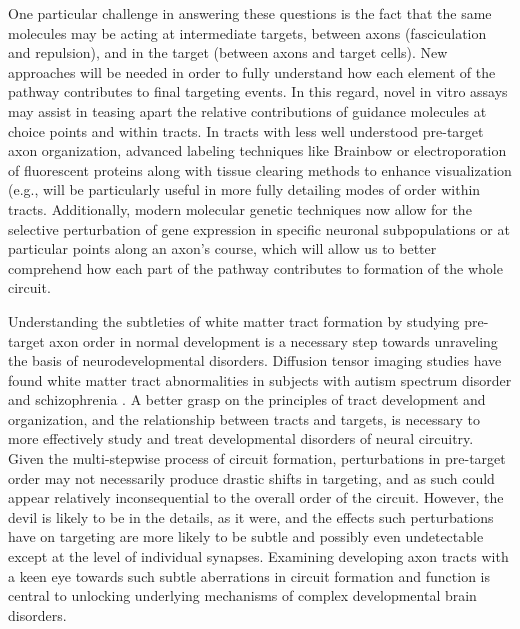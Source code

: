 One particular challenge in answering these questions is the fact that the same molecules may be acting at intermediate targets, between axons (fasciculation and repulsion), and in the target (between axons and target cells). 
New approaches will be needed in order to fully understand how each element of the pathway contributes to final targeting events. 
In this regard, novel in vitro assays may assist in teasing apart the relative contributions of guidance molecules at choice points and within tracts. 
In tracts with less well understood pre-target axon organization, advanced labeling techniques like Brainbow \cite{lu2009interscutularis} or electroporation of fluorescent proteins \cite{saito2001efficient} along with tissue clearing methods to enhance visualization (e.g., \cite{erturk2012three,kuwajima2013cleart,tomer2014advanced} will be particularly useful in more fully detailing modes of order within tracts. %
Additionally, modern molecular genetic techniques now allow for the selective perturbation of gene expression in specific neuronal subpopulations or at particular points along an axon’s course, which will allow us to better comprehend how each part of the pathway contributes to formation of the whole circuit. 

Understanding the subtleties of white matter tract formation by studying pre-target axon order in normal development is a necessary step towards unraveling the basis of neurodevelopmental disorders. 
Diffusion tensor imaging studies have found white matter tract abnormalities in subjects with autism spectrum disorder \cite{wolff2012differences} and schizophrenia \cite{kubicki2007review}. 
A better grasp on the principles of tract development and organization, and the relationship between tracts and targets, is necessary to more effectively study and treat developmental disorders of neural circuitry. 
Given the multi-stepwise process of circuit formation, perturbations in pre-target order may not necessarily produce drastic shifts in targeting, and as such could appear relatively inconsequential to the overall order of the circuit.
However, the devil is likely to be in the details, as it were, and the effects such perturbations have on targeting are more likely to be subtle and possibly even undetectable except at the level of individual synapses. 
Examining developing axon tracts with a keen eye towards such subtle aberrations in circuit formation and function is central to unlocking underlying mechanisms of complex developmental brain disorders.